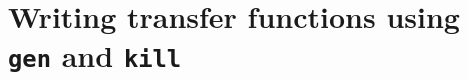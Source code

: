 \documentclass[blockstyle,preprint,nocopyrightspace]{sigplanconf}
\newcommand{\authornote}[1]{{\em #1}}
\def\authornote#1{\unskip\relax}
\newcommand{\john}[1]{\authornote{JD: #1}}
\newcommand\figref[1]{Figure~\ref{fig:#1}}
\begin{document}


\ifgenkill
\section{Writing transfer functions using \texttt{gen} and \texttt{kill}}
\end{document}
